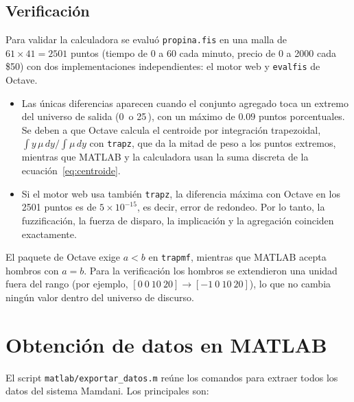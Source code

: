 \documentclass[11pt,letterpaper]{article}
\begin{document}
\subsection{Verificación}
Para validar la calculadora se evaluó \texttt{propina.fis} en una malla de $61 \times 41 = 2501$ puntos (tiempo de 0 a 60 cada minuto, precio de 0 a 2000 cada \$50) con dos implementaciones independientes: el motor web y \texttt{evalfis} de Octave.
\begin{itemize}[leftmargin=*]
  \item Las únicas diferencias aparecen cuando el conjunto agregado toca un extremo del universo de salida (0\,\text{\%} o 25\,\text{\%}), con un máximo de $0.09$ puntos porcentuales. Se deben a que Octave calcula el centroide por integración trapezoidal, $\int y\,\mu\,dy \big/ \int \mu\,dy$ con \texttt{trapz}, que da la mitad de peso a los puntos extremos, mientras que MATLAB y la calculadora usan la suma discreta de la ecuación~\eqref{eq:centroide}.
  \item Si el motor web usa también \texttt{trapz}, la diferencia máxima con Octave en los 2501 puntos es de $5 \times 10^{-15}$, es decir, error de redondeo. Por lo tanto, la fuzzificación, la fuerza de disparo, la implicación y la agregación coinciden exactamente.
\end{itemize}

\begin{nota}
El paquete de Octave exige $a < b$ en \texttt{trapmf}, mientras que MATLAB acepta hombros con $a = b$. Para la verificación los hombros se extendieron una unidad fuera del rango (por ejemplo, $[0\ 0\ 10\ 20] \to [-1\ 0\ 10\ 20]$), lo que no cambia ningún valor dentro del universo de discurso.
\end{nota}

\section{Obtención de datos en MATLAB}
El script \texttt{matlab/exportar\_datos.m} reúne los comandos para extraer todos los datos del sistema Mamdani. Los principales son:
\end{document}
